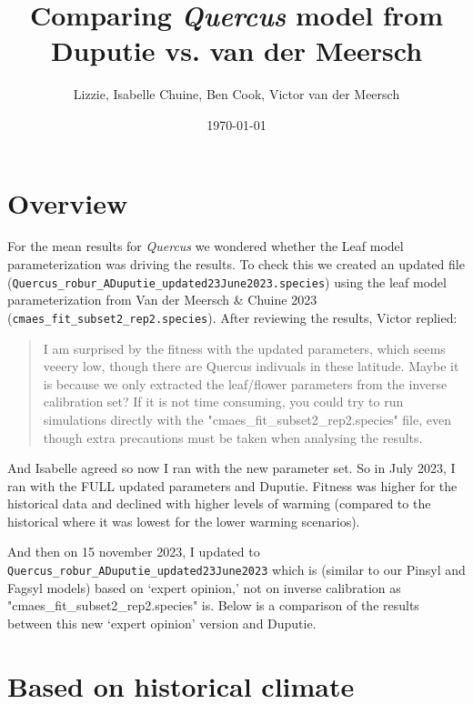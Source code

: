 \documentclass[11pt,letter]{article}
\begin{document}

\renewcommand{\refname}{\CHead{}}

\title{Comparing \emph{Quercus} model from \\ Duputie vs. van der Meersch}
\author{Lizzie, Isabelle Chuine, Ben Cook, Victor van der Meersch}
\date{\today}
\maketitle

\section*{Overview}
For the mean results for \emph{Quercus} we wondered whether the Leaf model parameterization was driving the results. To check this we created an updated file\\
 (\verb|Quercus_robur_ADuputie_updated23June2023.species|) using the leaf model parameterization from Van der Meersch \& Chuine 2023 \\(\verb|cmaes_fit_subset2_rep2.species|). After reviewing the results, Victor replied:

\begin{quote}
I am surprised by the fitness with the updated parameters, which seems veeery low, though there are Quercus indivuals in these latitude.
Maybe it is because we only extracted the leaf/flower parameters from the inverse calibration set?
If it is not time consuming, you could try to run simulations directly with the "cmaes\_fit\_subset2\_rep2.species" file, even though extra precautions must be taken when analysing the results.
\end{quote}

And Isabelle agreed so now I ran with the new parameter set. So in July 2023, I ran with the FULL updated parameters and Duputie. Fitness was higher for the historical data and declined with higher levels of warming (compared to the historical where it was lowest for the lower warming scenarios). 

And then on 15 november 2023, I updated to \verb|Quercus_robur_ADuputie_updated23June2023| which is (similar to our Pinsyl and Fagsyl models) based on `expert opinion,' not on inverse calibration as "cmaes\_fit\_subset2\_rep2.species" is. Below is a comparison of the results between this new `expert opinion' version and Duputie. 

\section*{Based on historical climate}
\end{document}
